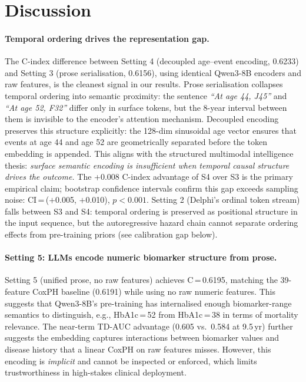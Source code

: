 \section{Discussion}

\paragraph{Temporal ordering drives the representation gap.}
The C-index difference between Setting 4 (decoupled age--event encoding,
0.6233) and Setting 3 (prose serialisation, 0.6156), using identical
Qwen3-8B encoders and raw features, is the cleanest signal in our
results.
Prose serialisation collapses temporal ordering into semantic proximity:
the sentence \textit{``At age 44, J45''} and \textit{``At age 52, F32''}
differ only in surface tokens, but the 8-year interval between them is
invisible to the encoder's attention mechanism.
Decoupled encoding preserves this structure explicitly: the 128-dim
sinusoidal age vector ensures that events at age 44 and age 52 are
geometrically separated before the token embedding is appended.
This aligns with the structured multimodal intelligence thesis:
\emph{surface semantic encoding is insufficient when temporal causal
structure drives the outcome.}
The +0.008 C-index advantage of S4 over S3 is the primary empirical claim;
bootstrap confidence intervals confirm this gap exceeds sampling noise:
CI\,=\,($+$0.005, $+$0.010), $p<0.001$.
Setting 2 (Delphi's ordinal token stream) falls between S3 and S4:
temporal ordering is preserved as positional structure in the input
sequence, but the autoregressive hazard chain cannot separate
ordering effects from pre-training priors (see calibration gap below).

\paragraph{Setting 5: LLMs encode numeric biomarker structure from prose.}
Setting 5 (unified prose, no raw features) achieves C\,=\,0.6195,
matching the 39-feature CoxPH baseline (0.6191) while using no raw
numeric features.
This suggests that Qwen3-8B's pre-training has internalised enough
biomarker-range semantics to distinguish, e.g., HbA1c\,=\,52 from
HbA1c\,=\,38 in terms of mortality relevance.
The near-term TD-AUC advantage (0.605 vs.\ 0.584 at 9.5\,yr) further
suggests the embedding captures interactions between biomarker values and
disease history that a linear CoxPH on raw features misses.
However, this encoding is \emph{implicit} and cannot be inspected or
enforced, which limits trustworthiness in high-stakes clinical deployment.

